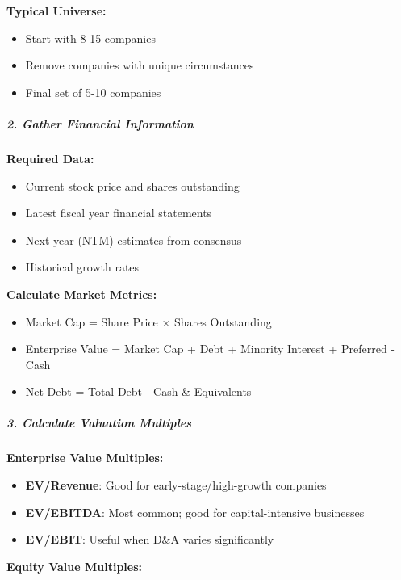 \documentclass[11pt]{article}
\begin{document}
\textbf{Typical Universe:}

\begin{itemize}[leftmargin=*,itemsep=2pt,topsep=2pt]
\item {} Start with 8-15 companies
\item {} Remove companies with unique circumstances
\item {} Final set of 5-10 companies
\end{itemize}

\subparagraph{2. Gather Financial Information}\mbox{}\par

\textbf{Required Data:}

\begin{itemize}[leftmargin=*,itemsep=2pt,topsep=2pt]
\item {} Current stock price and shares outstanding
\item {} Latest fiscal year financial statements
\item {} Next-year (NTM) estimates from consensus
\item {} Historical growth rates
\end{itemize}

\textbf{Calculate Market Metrics:}

\begin{itemize}[leftmargin=*,itemsep=2pt,topsep=2pt]
\item {} Market Cap = Share Price × Shares Outstanding
\item {} Enterprise Value = Market Cap + Debt + Minority Interest + Preferred - Cash
\item {} Net Debt = Total Debt - Cash \& Equivalents
\end{itemize}

\subparagraph{3. Calculate Valuation Multiples}\mbox{}\par

\textbf{Enterprise Value Multiples:}

\begin{itemize}[leftmargin=*,itemsep=2pt,topsep=2pt]
\item {} \textbf{EV/Revenue}: Good for early-stage/high-growth companies
\item {} \textbf{EV/EBITDA}: Most common; good for capital-intensive businesses
\item {} \textbf{EV/EBIT}: Useful when D\&A varies significantly
\end{itemize}

\textbf{Equity Value Multiples:}
\end{document}
